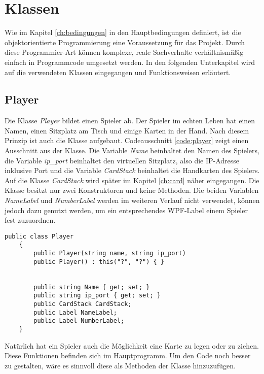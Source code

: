 \section{Klassen}
Wie im Kapitel \ref{ch:bedingungen} in den Hauptbedingungen definiert, ist die objektorientierte Programmierung eine Voraussetzung für das Projekt. Durch diese Programmier-Art können komplexe, reale Sachverhalte verhältnismäßig einfach in Programmcode umgesetzt werden. In den folgenden Unterkapitel wird auf die verwendeten Klassen eingegangen und Funktionsweisen erläutert.
\subsection{Player}
Die Klasse \textit{Player} bildet einen Spieler ab. Der Spieler im echten Leben hat einen Namen, einen Sitzplatz am Tisch und einige Karten in der Hand. Nach diesem Prinzip ist auch die Klasse aufgebaut. Codeausschnitt \ref{code:player} zeigt einen Ausschnitt aus der Klasse. Die Variable \textit{Name} beinhaltet den Namen des Spielers, die Variable \textit{ip\_port} beinhaltet den virtuellen Sitzplatz, also die IP-Adresse inklusive Port und die Variable \textit{CardStack} beinhaltet die Handkarten des Spielers. Auf die Klasse \textit{CardStack} wird später im Kapitel \ref{ch:card} näher eingegangen. Die Klasse besitzt nur zwei Konstruktoren und keine Methoden. Die beiden Variablen \textit{NameLabel} und \textit{NumberLabel} werden im weiteren Verlauf nicht verwendet, können jedoch dazu genutzt werden, um ein entsprechendes WPF-Label einem Spieler fest zuzuordnen.
\begin{lstlisting}[label=code:player, caption={Codeauschnitt Klasse \textit{Player}}]
 	public class Player
	{
		public Player(string name, string ip_port)
		public Player() : this("?", "?") { }
		
		
		public string Name { get; set; }
		public string ip_port { get; set; }
		public CardStack CardStack;
		public Label NameLabel;
		public Label NumberLabel;
	}
\end{lstlisting}
Natürlich hat ein Spieler auch die Möglichkeit eine Karte zu legen oder zu ziehen. Diese Funktionen befinden sich im Hauptprogramm. Um den Code noch besser zu gestalten, wäre es sinnvoll diese als Methoden der Klasse hinzuzufügen.

